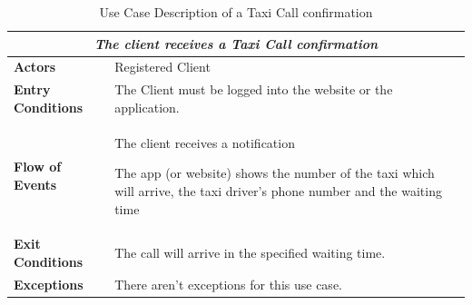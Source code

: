 \documentclass[a4paper]{article}
\begin{document}
\begin{enumerate}[label=\bfseries G\arabic*:]
\begin{table} [H]
\begin{center}
\begin{tabular}{ |m{}|m{}|  }
\hline
    \multicolumn{2}{|c|}{\textbf{\textit{The client receives a Taxi Call confirmation}}} \\
\hline \hline
    \textbf{Actors}
&   Registered Client
\\ \hline
    \textbf{Entry Conditions}
&   The Client must be logged into the website or the application.
\\ \hline
    \textbf{Flow of Events}
& 
    \begin{enumerate*}
    \item The client receives a notification
    \item The app (or website) shows the number of the taxi which will arrive, the taxi driver's phone number and the waiting time
    \end{enumerate*}
\\ \hline
    \textbf{Exit Conditions}
&   The call will arrive in the specified waiting time.
\\ \hline
    \textbf{Exceptions}
&   
    There aren't exceptions for this use case.
\\ \hline
\end{tabular}
\end{center}
\caption{Use Case Description of a Taxi Call confirmation}
\label{table:clientconfirmation}
\end{table}



\end{enumerate}
\end{document}
